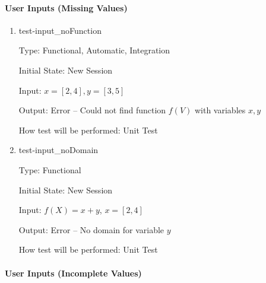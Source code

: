 \documentclass[12pt, titlepage]{article}
\begin{document}
\paragraph{User Inputs (Missing Values)}

\begin{enumerate}

	\item{test-input\_noFunction}
	
	Type: Functional, Automatic, Integration
	
	Initial State: New Session
	
	Input: $x = [2,4], y = [3,5]$
	
	Output: Error -- Could not find function $f(V)$ with variables $x, y$
	
	How test will be performed: Unit Test\\
	
	\item{test-input\_noDomain}
		
	Type: Functional
		
	Initial State: New Session
		
	Input: $f(X) = x + y$, $x = [2,4]$
		
	Output: Error -- No domain for variable $y$
		
	How test will be performed: Unit Test\\

\end{enumerate}

\paragraph{User Inputs (Incomplete Values)}
\end{document}
